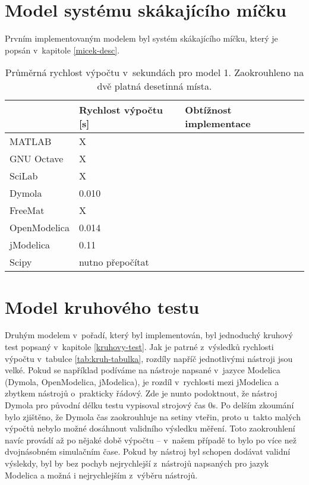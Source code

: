 \section{Model systému skákajícího míčku}
\label{srovnani-micek}
Prvním implementovaným modelem byl systém skákajícího míčku, který je popsán v~kapitole \ref{micek-desc}.


\begin{table}[ht]
\centering
\begin{tabular}{|l|l|l|}
\hline
             & Rychlost výpočtu {[}s{]} & Obtížnost implementace \\ \hline
MATLAB       &              X            &  \\ \hline
GNU Octave   &             X             &  \\ \hline
SciLab       &            X              &  \\ \hline
Dymola       &         0.010                 &  \\ \hline
FreeMat &                X          &  \\ \hline
OpenModelica    &       0.014                   &  \\ \hline
jModelica        &     0.11                     &  \\ \hline
Scipy           &          nutno přepočítat                &  \\ \hline
\end{tabular}
\caption{Průměrná rychlost výpočtu v~sekundách pro model 1. Zaokrouhleno na dvě platná desetinná místa.}
\label{tab:micek-tabulka}
\end{table}



\section{Model kruhového testu}
\label{srovnani-kruh}
Druhým modelem v~pořadí, který byl implementován, byl jednoduchý kruhový test popsaný v~kapitole \ref{kruhovy-test}. Jak je patrné z~výsledků rychlosti výpočtu v~tabulce \ref{tab:kruh-tabulka}, rozdíly napříč jednotlivými nástroji jsou velké. Pokud se například podíváme na nástroje napsané v~jazyce Modelica (Dymola, OpenModelica, jModelica), je rozdíl v~rychlosti mezi jModelica a zbytkem nástrojů o~prakticky řádový. Zde je nunto podoktnout, že nástroj Dymola pro původní délku testu vypisoval strojový čas 0s. Po delším zkoumání bylo zjištěno, že Dymola čas zaokrouhluje na setiny vteřin, proto u~takto malých výpočtů nebylo možné dosáhnout validního  výsledku měření. Toto zaokrouhlení navíc provádí až po nějaké době výpočtu -- v~našem případě to bylo po více než dvojnásobném simulačním čase. Pokud by nástroj byl schopen dodávat validní výslekdy, byl by bez pochyb nejrychlejší z~nástrojů napsaných pro jazyk Modelica a možná i nejrychlejším z~výběru nástrojů.

